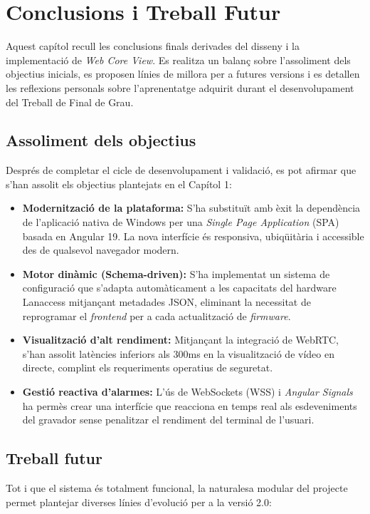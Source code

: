 \chapter{Conclusions i Treball Futur}
\label{ch:conclusions}

Aquest capítol recull les conclusions finals derivades del disseny i la implementació de \textit{Web Core View}. Es realitza un balanç sobre l'assoliment dels objectius inicials, es proposen línies de millora per a futures versions i es detallen les reflexions personals sobre l'aprenentatge adquirit durant el desenvolupament del Treball de Final de Grau.

\section{Assoliment dels objectius}
Després de completar el cicle de desenvolupament i validació, es pot afirmar que s'han assolit els objectius plantejats en el Capítol 1:

\begin{itemize}
    \item \textbf{Modernització de la plataforma:} S'ha substituït amb èxit la dependència de l'aplicació nativa de Windows per una \textit{Single Page Application} (SPA) basada en Angular 19. La nova interfície és responsiva, ubiqüitària i accessible des de qualsevol navegador modern.
    \item \textbf{Motor dinàmic (Schema-driven):} S'ha implementat un sistema de configuració que s'adapta automàticament a les capacitats del hardware Lanaccess mitjançant metadades JSON, eliminant la necessitat de reprogramar el \textit{frontend} per a cada actualització de \textit{firmware}.
    \item \textbf{Visualització d'alt rendiment:} Mitjançant la integració de WebRTC, s'han assolit latències inferiors als 300ms en la visualització de vídeo en directe, complint els requeriments operatius de seguretat.
    \item \textbf{Gestió reactiva d'alarmes:} L'ús de WebSockets (WSS) i \textit{Angular Signals} ha permès crear una interfície que reacciona en temps real als esdeveniments del gravador sense penalitzar el rendiment del terminal de l'usuari.
\end{itemize}

\section{Treball futur}
Tot i que el sistema és totalment funcional, la naturalesa modular del projecte permet plantejar diverses línies d'evolució per a la versió 2.0:

